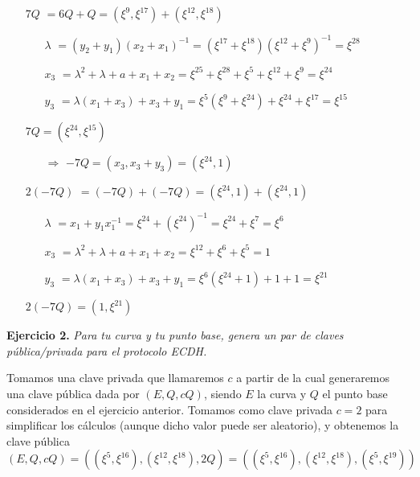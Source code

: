 \documentclass[fleqn]{article}
\begin{document}
    \begin{itemize}
        \item[$7Q$] $ = 6Q + Q = (\xi^{9}, \xi^{17}) + (\xi^{12}, \xi^{18})$
            \begin{itemize}
                \item[$\lambda$] $ = (y_2 + y_1)(x_2 + x_1)^{-1} = (\xi^{17} + \xi^{18})(\xi^{12} + \xi^{9})^{-1} = \xi^{28}$
                \item[$x_3$] $ = \lambda^2 + \lambda + a + x_1 + x_2 = \xi^{25} + \xi^{28} + \xi^{5} + \xi^{12} + \xi^{9} = \xi^{24}$
                \item[$y_3$] $ = \lambda(x_1 + x_3) + x_3 + y_1 = \xi^{5} (\xi^{9} + \xi^{24}) + \xi^{24} + \xi^{17} = \xi^{15}$
            \end{itemize}
            $7Q = (\xi^{24}, \xi^{15})$
            \begin{itemize}
                \item[$\Rightarrow$] $-7Q = (x_3, x_3 + y_3) = (\xi^{24}, 1)$
            \end{itemize}
        \item[$2(-7Q)$] $ = (-7Q) + (-7Q) = (\xi^{24}, 1) + (\xi^{24}, 1)$
            \begin{itemize}
                \item[$\lambda$] $ = x_1 + y_1x_1^{-1} = \xi^{24} + (\xi^{24})^{-1} = \xi^{24} + \xi^{7} = \xi^{6}$
                \item[$x_3$] $ = \lambda^2 + \lambda + a + x_1 + x_2 = \xi^{12} + \xi^{6} + \xi^{5} = 1$
                \item[$y_3$] $ = \lambda(x_1 + x_3) + x_3 + y_1 = \xi^{6} (\xi^{24} + 1) + 1 + 1 = \xi^{21}$
            \end{itemize}
            $2(-7Q) = (1, \xi^{21})$
    \end{itemize}



    \newpage
    \textbf{Ejercicio 2. }\textit{Para tu curva y tu punto base, genera un par de claves pública/privada para el protocolo ECDH.}
    \vspace{0.5cm}

    Tomamos una clave privada que llamaremos $c$ a partir de la cual generaremos una clave pública dada por $(E, Q, cQ)$, siendo $E$ la curva
    y $Q$ el punto base considerados en el ejercicio anterior. Tomamos como clave privada $c = 2$ para simplificar los cálculos (aunque dicho valor puede ser aleatorio), 
    y obtenemos la clave pública 
    $$(E, Q, cQ) = ((\xi^5, \xi^{16}), (\xi^{12}, \xi^{18}), 2Q) = ((\xi^5, \xi^{16}), (\xi^{12}, \xi^{18}), (\xi^{5}, \xi^{19}))$$
\end{document}
